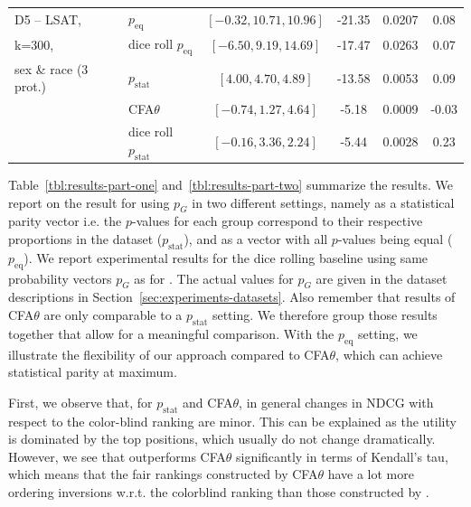 \begin{table}[t!]
{\begin{tabular}{llcccc}
		\midrule
		\midrule
		D5 -- LSAT, 			& \algoFAIR $p_{\text{eq}}$ 	& $[-0.32, 10.71, 10.96]$ 	& -21.35 	& 0.0207 	& 0.08 \\
		k=300, 					& dice roll $p_{\text{eq}}$		& $[-6.50, 9.19, 14.69]$	& -17.47	& 0.0263 	& 0.07\\
								\cline{2-6}
		sex \& race (3 prot.)	& \algoFAIR $p_{\text{stat}}$ 	& $[4.00, 4.70, 4.89]$ 		& -13.58 	& 0.0053	& 0.09 \\
							 	& CFA$\theta$ 					& $[-0.74, 1.27, 4.64]$ 	& -5.18		& 0.0009 	& -0.03 \\
								& dice roll $p_{\text{stat}}$	& $[-0.16, 3.36, 2.24]$		& -5.44		& 0.0028 	& 0.23 \\

		\bottomrule
	\end{tabular}
	}
\end{table}
%
Table~\ref{tbl:results-part-one} and~\ref{tbl:results-part-two} summarize the results. 
%
We report on the result for \algoFAIR using $p_G$ in two different settings, namely as a statistical parity vector i.e. the $p$-values for each group correspond to their respective proportions in the dataset ($p_{\text{stat}}$), and as a vector with all $p$-values being equal ($p_{\text{eq}}$).
%
We report experimental results for the dice rolling baseline using same probability vectors $p_G$ as for \algoFAIR.
%
The actual values for $p_G$ are given in the dataset descriptions in Section~\ref{sec:experiments-datasets}.
%
Also remember that results of CFA$\theta$ are only comparable to a \algoFAIR $p_{\text{stat}}$ setting.
%
We therefore group those results together that allow for a meaningful comparison.
%
With the $p_{\text{eq}}$ setting, we illustrate the flexibility of our approach compared to CFA$\theta$, which can achieve statistical parity at maximum.

First, we observe that, for \algoFAIR $p_{\text{stat}}$ and CFA$\theta$, in general changes in NDCG with respect to the color-blind ranking are minor.
%
This can be explained as the utility is dominated by the top positions, which usually do not change dramatically.
%
However, we see that \algoFAIR outperforms CFA$\theta$ significantly in terms of Kendall's tau, which means that the fair rankings constructed by CFA$\theta$ have a lot more ordering inversions w.r.t. the colorblind ranking than those constructed by \algoFAIR. 

